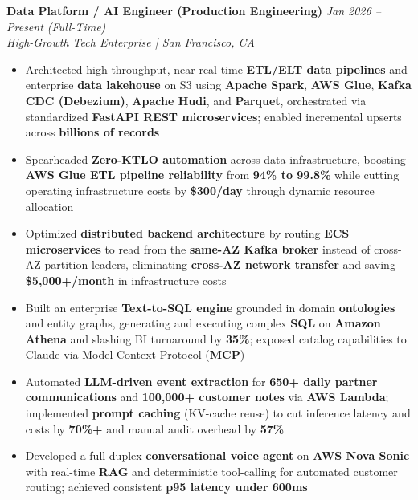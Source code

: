 \documentclass[10pt]{article}
\begin{document}
\textbf{Data Platform / AI Engineer (Production Engineering)} \hfill \textcolor{subheadingcolor}{\textit{Jan 2026 -- Present (Full-Time)}} \\
\textit{High-Growth Tech Enterprise | San Francisco, CA}
\begin{itemize}
    \item Architected high-throughput, near-real-time \textbf{ETL/ELT data pipelines} and enterprise \textbf{data lakehouse} on S3 using \textbf{Apache Spark}, \textbf{AWS Glue}, \textbf{Kafka CDC (Debezium)}, \textbf{Apache Hudi}, and \textbf{Parquet}, orchestrated via standardized \textbf{FastAPI REST microservices}; enabled incremental upserts across \textbf{billions of records}
    \item Spearheaded \textbf{Zero-KTLO automation} across data infrastructure, boosting \textbf{AWS Glue ETL pipeline reliability} from \textbf{94\% to 99.8\%} while cutting operating infrastructure costs by \textbf{\$300/day} through dynamic resource allocation
    \item Optimized \textbf{distributed backend architecture} by routing \textbf{ECS microservices} to read from the \textbf{same-AZ Kafka broker} instead of cross-AZ partition leaders, eliminating \textbf{cross-AZ network transfer} and saving \textbf{\$5,000+/month} in infrastructure costs
    \item Built an enterprise \textbf{Text-to-SQL engine} grounded in domain \textbf{ontologies} and entity graphs, generating and executing complex \textbf{SQL} on \textbf{Amazon Athena} and slashing BI turnaround by \textbf{35\%}; exposed catalog capabilities to Claude via Model Context Protocol (\textbf{MCP})
    \item Automated \textbf{LLM-driven event extraction} for \textbf{650+ daily partner communications} and \textbf{100,000+ customer notes} via \textbf{AWS Lambda}; implemented \textbf{prompt caching} (KV-cache reuse) to cut inference latency and costs by \textbf{70\%+} and manual audit overhead by \textbf{57\%}
    \item Developed a full-duplex \textbf{conversational voice agent} on \textbf{AWS Nova Sonic} with real-time \textbf{RAG} and deterministic tool-calling for automated customer routing; achieved consistent \textbf{p95 latency under 600ms}
\end{itemize}
\vspace{-0.3em}
\end{document}
